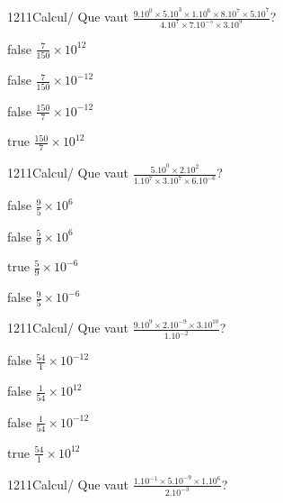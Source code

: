             \begin{question}{1211}{Calcul}{}{/}
                Que vaut $\frac{9.10^{0}\times 5.10^{3}\times 1.10^{6}\times 8.10^{7}\times 5.10^{7}}{4.10^{7}\times 7.10^{-5}\times 3.10^{9}}$?
            \end{question}
            \begin{reponses}
                \item[false] $\frac{7}{150}\times 10^{12}$
                \item[false] $\frac{7}{150}\times 10^{-12}$
                \item[false] $\frac{150}{7}\times 10^{-12}$
                \item[true] $\frac{150}{7}\times 10^{12}$
            \end{reponses}
            \begin{question}{1211}{Calcul}{}{/}
                Que vaut $\frac{5.10^{0}\times 2.10^{2}}{1.10^{7}\times 3.10^{7}\times 6.10^{-6}}$?
            \end{question}
            \begin{reponses}
                \item[false] $\frac{9}{5}\times 10^{6}$
                \item[false] $\frac{5}{9}\times 10^{6}$
                \item[true] $\frac{5}{9}\times 10^{-6}$
                \item[false] $\frac{9}{5}\times 10^{-6}$
            \end{reponses}
            \begin{question}{1211}{Calcul}{}{/}
                Que vaut $\frac{9.10^{9}\times 2.10^{-9}\times 3.10^{10}}{1.10^{-2}}$?
            \end{question}
            \begin{reponses}
                \item[false] $\frac{54}{1}\times 10^{-12}$
                \item[false] $\frac{1}{54}\times 10^{12}$
                \item[false] $\frac{1}{54}\times 10^{-12}$
                \item[true] $\frac{54}{1}\times 10^{12}$
            \end{reponses}
            \begin{question}{1211}{Calcul}{}{/}
                Que vaut $\frac{1.10^{-1}\times 5.10^{-9}\times 1.10^{6}}{2.10^{-3}}$?
            \end{question}
